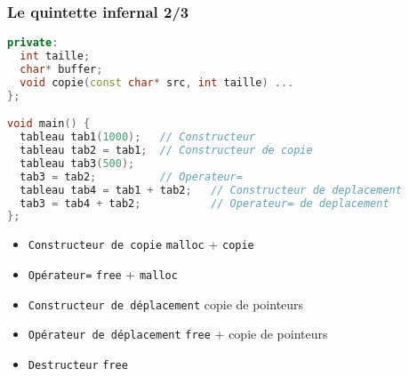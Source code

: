 \documentclass{beamer}
\begin{document}
\begin{frame}[fragile=singleslide,shrink=20]
\frametitle {Le quintette infernal 2/3}
\begin{lstlisting}[language=c++]
private:
  int taille;
  char* buffer;
  void copie(const char* src, int taille) ...
};

void main() {
  tableau tab1(1000);   // Constructeur
  tableau tab2 = tab1;  // Constructeur de copie
  tableau tab3(500);
  tab3 = tab2;          // Operateur=
  tableau tab4 = tab1 + tab2;   // Constructeur de deplacement
  tab3 = tab4 + tab2;           // Operateur= de deplacement
};
\end{lstlisting}

\begin{itemize}
\item{\texttt{Constructeur de copie}  \texttt{malloc} + \texttt{copie} }
\item{\texttt{Opérateur=} \texttt{free} + \texttt{malloc} }
\item{\texttt{Constructeur de déplacement} copie de pointeurs }
\item{\texttt{Opérateur de déplacement} \texttt{free} + copie de pointeurs }
\item{\texttt{Destructeur} \texttt{free} }
\end{itemize}
\end{frame}
\end{document}
